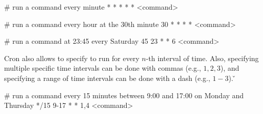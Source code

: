 \be
\begin{block}
# run a command every minute
* * * * * <command>
\end{block}

\begin{block}
# run a command every hour at the 30th minute
30 * * * * <command>
\end{block}

\begin{block}
# run a command at 23:45 every Saturday
45 23 * * 6 <command>
\end{block}
\ee

Cron also allows to specify  to run for every $n$-th interval of time. Also, specifying multiple specific time
intervals can be done with commas (e.g., $1,2,3$), and specifying a range of time intervals can be done with a dash
(e.g., $1-3$). \v

\be
\begin{block}
# run a command every 15 minutes between 9:00 and 17:00 on Monday and Thursday
*/15 9-17 * * 1,4 <command>
\end{block}
\ee